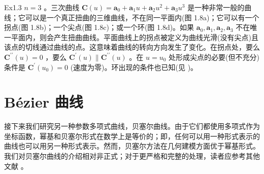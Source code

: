 \documentclass[../main.tex]{subfiles}
\begin{document}
\begin{center}
\begin{minipage}{14cm}
\centering
{}
\captionsetup{font=small,justification=centering,singlelinecheck=false,skip=6pt}
\end{minipage}
\end{center}

\noindent\begin{minipage}{\linewidth}
Ex1.3 \(n = 3\) 。三次曲线 \(\mathbf{C}\left( u\right)  = {\mathbf{a}}_{0} + {\mathbf{a}}_{1}u + {\mathbf{a}}_{2}{u}^{2} + {\mathbf{a}}_{3}{u}^{3}\) 是一种非常一般的曲线；它可以是一个真正扭曲的三维曲线，不在同一平面内(图 1.8a)；它可以有一个拐点(图 1.8b)；一个尖点(图 1.8c)；或一个环(图 1.8d)。如果 \({\mathbf{a}}_{0},{\mathbf{a}}_{1},{\mathbf{a}}_{2},{\mathbf{a}}_{3}\) 不在唯一平面内，则会产生扭曲曲线。平面曲线上的拐点被定义为曲线光滑(没有尖点)且该点的切线通过曲线的点。这意味着曲线的转向方向发生了变化。在拐点处，要么 \({\mathbf{C}}^{\prime \prime }\left( u\right)  = 0\) ，要么 \({\mathbf{C}}^{\prime }\left( u\right)  \parallel {\mathbf{C}}^{\prime \prime }\left( u\right)\) 。在 \(u = {u}_{0}\) 处形成尖点的必要(但不充分)条件是 \({\mathbf{C}}^{\prime }\left( {u}_{0}\right)  = 0\) (速度为零)。环出现的条件也已知(见 \cite{Ferg66,Ferg67,Ferg69,Ferg93,Forr70,Forr80,Wang81,Ston89,Su89})。

\begin{center}
\begin{minipage}{15cm}
  \centering

  \vspace{3mm}
  \captionsetup{font=small,justification=centering,singlelinecheck=false,skip=6pt}
\end{minipage}
\end{center}
\end{minipage}
\par\medskip

\section{Bézier 曲线}

接下来我们研究另一种参数多项式曲线，贝塞尔曲线。由于它们都使用多项式作为坐标函数，幂基和贝塞尔形式在数学上是等价的；即，任何可以用一种形式表示的曲线也可以用另一种形式表示。然而，贝塞尔方法在几何建模方面优于幂基形式。我们对贝塞尔曲线的介绍相对非正式；对于更严格和完整的处理，读者应参考其他文献 \cite{Forr72,Bezi72,Bezi86,Gord74a,Chan81,Fari93,Yama88,Hosc93,Roge90}。
\end{document}
